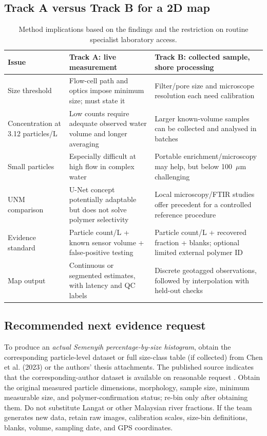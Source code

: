 \documentclass[10pt,a4paper]{article}
\begin{document}
\subsection{Track A versus Track B for a 2D map}
\begin{table}[H]\centering\small\caption{Method implications based on the findings and the restriction on routine specialist laboratory access.}
\begin{tabularx}{\linewidth}{@{}p{2.9cm}XX@{}}\toprule
Issue & Track A: live measurement & Track B: collected sample, shore processing\\\midrule
Size threshold & Flow-cell path and optics impose minimum size; must state it & Filter/pore size and microscope resolution each need calibration\\
Concentration at 3.12 particles/L & Low counts require adequate observed water volume and longer averaging & Larger known-volume samples can be collected and analysed in batches\\
Small particles & Especially difficult at high flow in complex water & Portable enrichment/microscopy may help, but below 100~$\mu$m challenging\\
UNM comparison & U-Net concept potentially adaptable but does not solve polymer selectivity & Local microscopy/FTIR studies offer precedent for a controlled reference procedure\\
Evidence standard & Particle count/L + known sensor volume + false-positive testing & Particle count/L + recovered fraction + blanks; optional limited external polymer ID\\
Map output & Continuous or segmented estimates, with latency and QC labels & Discrete geotagged observations, followed by interpolation with held-out checks\\\bottomrule
\end{tabularx}\end{table}

\subsection{Recommended next evidence request}
To produce an \emph{actual Semenyih percentage-by-size histogram}, obtain the corresponding particle-level dataset or full size-class table (if collected) from Chen et al. (2023) or the authors' thesis attachments. The published source indicates that the corresponding-author dataset is available on reasonable request \cite{Corpus08}. Obtain the original measured particle dimensions, morphology, sample size, minimum measurable size, and polymer-confirmation status; re-bin only after obtaining them. Do not substitute Langat or other Malaysian river fractions. If the team generates new data, retain raw images, calibration scales, size-bin definitions, blanks, volume, sampling date, and GPS coordinates.
\end{document}
